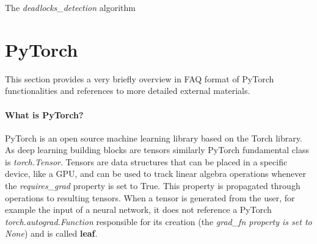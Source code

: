 \documentclass[11pt, a4paper, hidelinks]{report}
\begin{document}
\begin{algorithm}[H]


\caption{The \textit{deadlocks\_detection} algorithm}\label{alg:deadlocks}
\end{algorithm}

\newpage

\section{PyTorch}\label{sec:pytorch}

This section provides a very briefly overview in FAQ format of PyTorch functionalities and references to more detailed external materials.

\paragraph{What is PyTorch?}\label{par:what-is-pytorch}
PyTorch is an open source machine learning library based on the Torch library.
As deep learning building blocks are tensors similarly PyTorch fundamental class is \textit{torch.Tensor}.
Tensors are data structures that can be placed in a specific device, like a GPU, and can be used to track linear algebra operations whenever the \textit{requires\_grad} property is set to True.
This property is propagated through operations to resulting tensors.
When a tensor is generated from the user, for example the input of a neural network, it does not reference a PyTorch \textit{torch.autograd.Function} responsible for its creation (the \textit{grad\_fn property is set to None}) and is called \textbf{leaf}.
\end{document}
